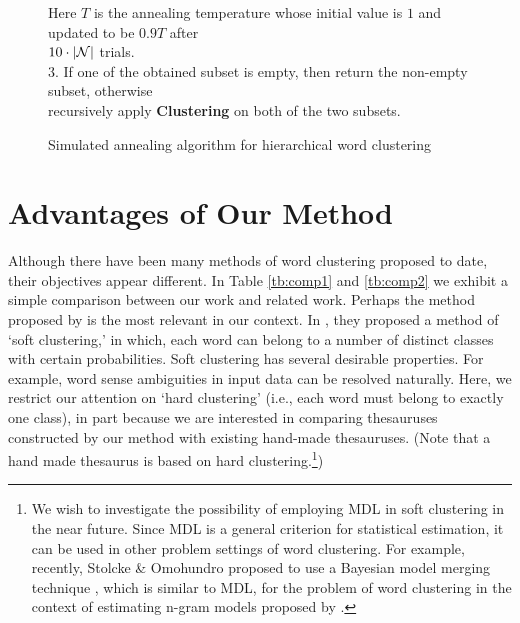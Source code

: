 \begin{figure*}[htb]
\begin{center}
\begin{tabbing}
\tab Here $T$ is the annealing temperature whose initial value
is $1$ and updated to be $0.9T$ after \\ 

\tab $10 \cdot |{\cal N}|$ trials. \\ 

3. If one of the obtained subset is empty, then return the non-empty
subset, otherwise \\ 

recursively apply {\bf Clustering} on both of the two subsets. \\ 
\end{tabbing}
\caption{Simulated annealing algorithm for hierarchical word clustering}
\label{fig:algorithm}
\end{center}
\end{figure*}

\section{Advantages of Our Method}
Although there have been many methods of word clustering proposed to
date, their objectives appear different. In Table \ref{tb:comp1} and
\ref{tb:comp2} we exhibit a simple comparison between our work and
related work. Perhaps the method proposed by \cite{Pereira93} is the
most relevant in our context. In \cite{Pereira93}, they proposed a
method of `soft clustering,' in which, each word can belong to a
number of distinct classes with certain probabilities. Soft clustering
has several desirable properties. For example, word sense ambiguities
in input data can be resolved naturally. Here, we restrict our
attention on `hard clustering' (i.e., each word must belong to exactly
one class), in part because we are interested in comparing thesauruses
constructed by our method with existing hand-made thesauruses. (Note
that a hand made thesaurus is based on hard clustering.\footnote{We
  wish to investigate the possibility of employing MDL in soft
  clustering in the near future. Since MDL is a general criterion for
  statistical estimation, it can be used in other problem settings of
  word clustering. For example, recently, Stolcke \& Omohundro
  proposed to use a Bayesian model merging technique \cite{Stolcke94},
  which is similar to MDL, for the problem of word clustering in the
  context of estimating n-gram models proposed by \cite{Brown92}.})

